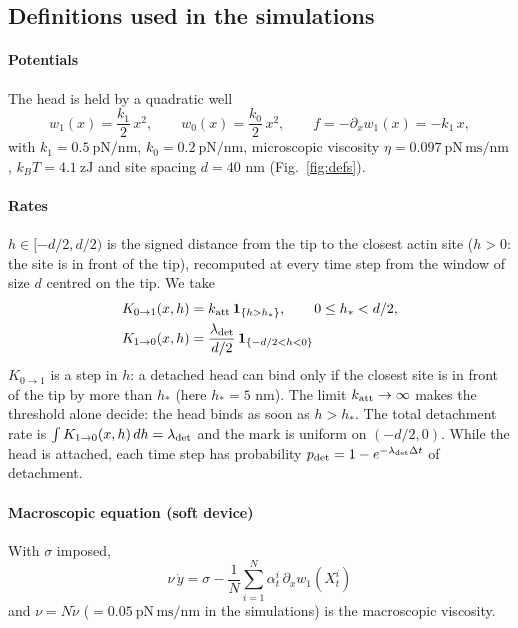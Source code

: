 \documentclass{article}
\begin{document}
\subsection*{Definitions used in the simulations}

\paragraph{Potentials} The head is held by a quadratic well  
\begin{equation}
w_1(x)=\frac{k_1}{2}\,x^2,\qquad w_0(x)=\frac{k_0}{2}\,x^2,\qquad f=-\partial_x w_1(x)=-k_1\,x ,
\end{equation}
with $k_1=0.5\ \mathrm{pN/nm}$, $k_0=0.2\ \mathrm{pN/nm}$, microscopic viscosity $\eta=0.097\ \mathrm{pN\,ms/nm}$, $k_BT=4.1\ \mathrm{zJ}$ and site spacing $d=40$ nm (Fig.~\ref{fig:defs}).

\paragraph{Rates}  $h\in[-d/2,d/2)$ is the signed distance from the tip to the closest actin site ($h>0$: the site is in front of the tip), recomputed at every time step from the window of size $d$ centred on the tip. We take
\begin{align}
K_{0\to1}(x,h) &= k_{\rm att}\,\mathbf 1_{\{h>h_\ast\}}, \qquad 0\le h_\ast<d/2,\\
K_{1\to0}(x,h) &= \frac{\lambda_{\rm det}}{d/2}\,\mathbf 1_{\{-d/2<h<0\}}
\end{align}
$K_{0\to1}$ is a step in $h$: a detached head can bind only if the closest site is in front of the tip by more than $h_\ast$ (here $h_\ast=5$ nm). The limit $k_{\rm att}\to\infty$ makes the threshold alone decide: the head binds as soon as $h>h_\ast$.  The total detachment rate is $\int K_{1\to0}(x,h)\,dh=\lambda_{\rm det}$ and the mark is uniform on $(-d/2,0)$. While the head is attached, each time step has probability
$p_{\rm det}=1-e^{-\lambda_{\rm det}\Delta t}$ of detachment.

\paragraph{Macroscopic equation (soft device)} With $\sigma$ imposed,
\begin{equation}
\nu\,\dot y=\sigma-\frac{1}{N}\sum_{i=1}^N\alpha^i_t\,\partial_x w_1(X^i_t)
\end{equation}
and $\nu=N\tilde\nu$ ($=0.05\ \mathrm{pN\,ms/nm}$ in the simulations) is the macroscopic viscosity.
\end{document}
